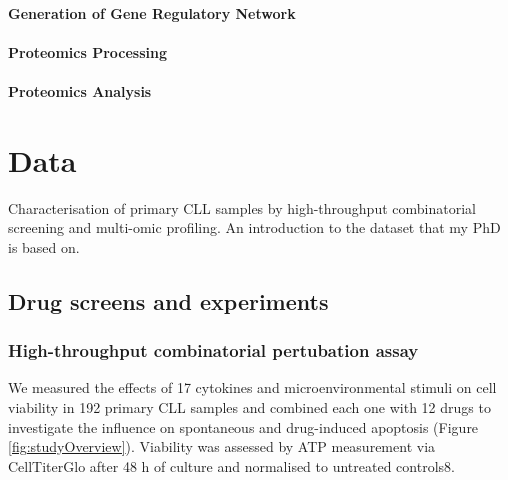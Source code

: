 \documentclass[11pt, a4paper, twosided]{book}
\begin{document}
\hypertarget{generation-of-gene-regulatory-network}{%
\subsubsection{Generation of Gene Regulatory Network}\label{generation-of-gene-regulatory-network}}

\hypertarget{proteomics-processing}{%
\subsubsection{Proteomics Processing}\label{proteomics-processing}}

\hypertarget{proteomics-analysis}{%
\subsubsection{Proteomics Analysis}\label{proteomics-analysis}}

\hypertarget{data}{%
\chapter{Data}\label{data}}

Characterisation of primary CLL samples by high-throughput combinatorial screening and multi-omic profiling. An introduction to the dataset that my PhD is based on.

\hypertarget{drug-screens-and-experiments}{%
\section{Drug screens and experiments}\label{drug-screens-and-experiments}}

\hypertarget{high-throughput-combinatorial-pertubation-assay}{%
\subsection{High-throughput combinatorial pertubation assay}\label{high-throughput-combinatorial-pertubation-assay}}

We measured the effects of 17 cytokines and microenvironmental stimuli on cell viability in 192 primary CLL samples and combined each one with 12 drugs to investigate the influence on spontaneous and drug-induced apoptosis (Figure \ref{fig:studyOverview}). Viability was assessed by ATP measurement via CellTiterGlo after 48 h of culture and normalised to untreated controls8.
\end{document}
